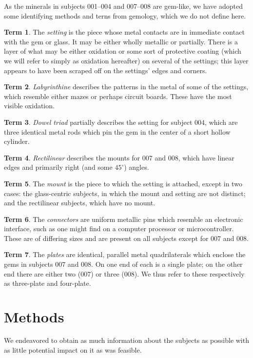 \documentclass[10pt]{article}
\theoremstyle{definition}
\newtheorem{term}{Term}
\begin{document}
As the minerals in subjects 001--004 and 007--008 are gem-like, we have adopted some identifying methods and terns from gemology, which we do not define here.

\begin{term}
The \emph{setting} is the piece whose metal contacts are in immediate contact with the gem or glass. It may be either wholly metallic or partially. There is a layer of what may be either oxidation or some sort of protective coating (which we will refer to simply as oxidation hereafter) on several of the settings; this layer appears to have been scraped off on the settings' edges and corners.
\end{term}
\begin{term}
\emph{Labyrinthine} describes the patterns in the metal of some of the settings, which resemble either mazes or perhaps circuit boards. These have the most visible oxidation.
\end{term}
\begin{term}
\emph{Dowel triad} partially describes the setting for subject 004, which are three identical metal rods which pin the gem in the center of a short hollow cylinder.
\end{term}
\begin{term}
\emph{Rectilinear} describes the mounts for 007 and 008, which have linear edges and primarily right (and some $45^\circ$) angles.
\end{term}
\begin{term}
The \emph{mount} is the piece to which the setting is attached, except in two cases: the glass-centric subjects, in which the mount and setting are not distinct; and the rectilinear subjects, which have no mount.
\end{term}
\begin{term}
The \emph{connectors} are uniform metallic pins which resemble an electronic interface, such as one might find on a computer processor or microcontroller. These are of differing sizes and are present on all subjects except for 007 and 008.
\end{term}
\begin{term}
The \emph{plates} are identical, parallel metal quadrilaterals which enclose the gems in subjects 007 and 008. On one end of each is a single plate; on the other end there are either two (007) or three (008). We thus refer to these respectively as three-plate and four-plate.
\end{term}

\section{Methods}
We endeavored to obtain as much information about the subjects as possible with as little potential impact on it as was feasible.
\end{document}
